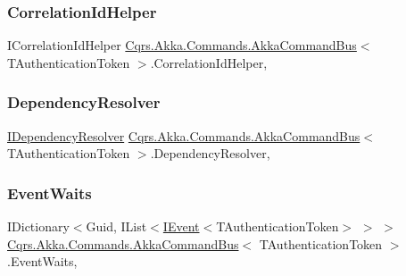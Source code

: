 \subsubsection{\texorpdfstring{Correlation\+Id\+Helper}{CorrelationIdHelper}}
{\footnotesize\ttfamily I\+Correlation\+Id\+Helper \hyperlink{classCqrs_1_1Akka_1_1Commands_1_1AkkaCommandBus}{Cqrs.\+Akka.\+Commands.\+Akka\+Command\+Bus}$<$ T\+Authentication\+Token $>$.Correlation\+Id\+Helper\hspace{0.3cm}{\ttfamily [get]}, {\ttfamily [protected]}}

\mbox{\label{classCqrs_1_1Akka_1_1Commands_1_1AkkaCommandBus_ae1229644077b0740d9014708d15b44c2}} 
\subsubsection{\texorpdfstring{Dependency\+Resolver}{DependencyResolver}}
{\footnotesize\ttfamily \hyperlink{interfaceCqrs_1_1Configuration_1_1IDependencyResolver}{I\+Dependency\+Resolver} \hyperlink{classCqrs_1_1Akka_1_1Commands_1_1AkkaCommandBus}{Cqrs.\+Akka.\+Commands.\+Akka\+Command\+Bus}$<$ T\+Authentication\+Token $>$.Dependency\+Resolver\hspace{0.3cm}{\ttfamily [get]}, {\ttfamily [protected]}}

\mbox{\label{classCqrs_1_1Akka_1_1Commands_1_1AkkaCommandBus_af64744500f25a0b203684ef757aa7962}} 
\subsubsection{\texorpdfstring{Event\+Waits}{EventWaits}}
{\footnotesize\ttfamily I\+Dictionary$<$Guid, I\+List$<$\hyperlink{interfaceCqrs_1_1Events_1_1IEvent}{I\+Event}$<$T\+Authentication\+Token$>$ $>$ $>$ \hyperlink{classCqrs_1_1Akka_1_1Commands_1_1AkkaCommandBus}{Cqrs.\+Akka.\+Commands.\+Akka\+Command\+Bus}$<$ T\+Authentication\+Token $>$.Event\+Waits\hspace{0.3cm}{\ttfamily [get]}, {\ttfamily [protected]}}

